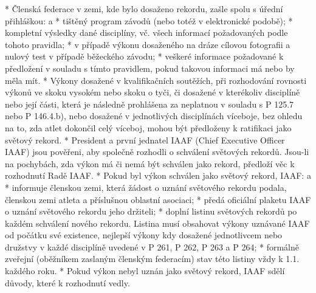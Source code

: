 * Členská federace v zemi, kde bylo dosaženo rekordu, zašle spolu s úřední přihláškou:
  \begitems \style a
  * tištěný program závodů (nebo totéž v elektronické podobě);
  * kompletní výsledky dané disciplíny, vč. všech informací požadovaných podle tohoto pravidla;
  * v případě výkonu dosaženého na dráze cílovou fotografii a nulový test v případě běžeckého závodu;
  * veškeré informace požadované k předložení v souladu s tímto pravidlem, pokud takovou informaci má nebo by měla mít.
  \enditems
* Výkony dosažené v kvalifikačních soutěžích, při rozhodování rovnosti výkonů ve skoku vysokém nebo skoku o tyči, či dosažené v kterékoliv disciplíně nebo její části, která je následně prohlášena za neplatnou v souladu s P 125.7 nebo P 146.4.b), nebo dosažené v jednotlivých disciplínách víceboje, bez ohledu na to, zda atlet dokončil celý víceboj, mohou být předloženy k ratifikaci jako světový rekord.
* President a první jednatel IAAF (Chief Executive Officer IAAF) jsou pověřeni, aby společně rozhodli o schválení světových rekordů. Jsou-li na pochybách, zda výkon má či nemá být schválen jako rekord, předloží věc k rozhodnutí Radě IAAF.
* Pokud byl výkon schválen jako světový rekord, IAAF:
  \begitems \style a
  * informuje členskou zemi, která žádost o uznání světového rekordu podala, členskou zemi atleta a příslušnou oblastní asociaci;
  * předá oficiální plaketu IAAF o uznání světového rekordu jeho držiteli;
  * doplní listinu světových rekordů po každém schválení nového rekordu. Listina musí obsahovat výkony uznávané IAAF od počátku své existence, nejlepší výkony kdy dosažené jednotlivcem nebo družstvy v každé disciplíně uvedené v P 261, P 262, P 263 a P 264;
  * formálně zveřejní (oběžníkem zaslaným členským federacím) stav této listiny vždy k 1.1. každého roku.
  \enditems
* Pokud výkon nebyl uznán jako světový rekord, IAAF sdělí důvody, které k rozhodnutí vedly.

